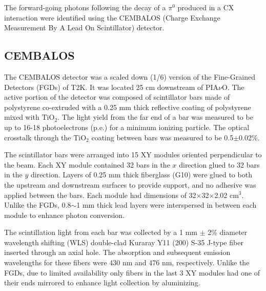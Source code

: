 The forward-going photons following the decay of a $\pi^0$ produced in a CX interaction were identified using the CEMBALOS (Charge Exchange Measurement By A Lead On Scintillator) detector.

\subsection{CEMBALOS}
The CEMBALOS detector was a scaled down (1/6) version of the Fine-Grained Detectors (FGDs) \cite{fgd} of T2K. It was located 25 cm downstream of PIA$\nu$O. The active portion of the detector was composed of scintillator bars made of polystyrene co-extruded with a 0.25 mm thick reflective coating of polystyrene mixed with TiO$_2$. The light yield from the far end of a bar was measured to be up to 16-18 photoelectrons (p.e.) for a minimum ionizing particle. The optical crosstalk through the TiO$_2$ coating between bars was measured to be 0.5$\pm$0.02\%. 

The scintillator bars were arranged into 15 XY modules oriented perpendicular to the beam. Each XY module contained 32 bars in the $x$ direction glued to 32 bars in the $y$ direction. Layers of 0.25 mm thick fiberglass (G10) were glued to both the upstream and downstream surfaces to provide support, and no adhesive was applied between the bars. Each module had dimensions of 32$\times$32$\times$2.02 cm$^3$. Unlike the FGDs, 0.8$\sim$1 mm thick lead layers were interspersed in between each module to enhance photon conversion. 


The scintillation light from each bar was collected by a 1 mm $\pm$ 2\% diameter wavelength shifting (WLS) double-clad Kuraray Y11 (200) S-35 J-type fiber inserted through an axial hole. The absorption and subsequent emission wavelengths for these fibers were 430 nm and 476 nm, respectively. Unlike the FGDs, due to limited availability only fibers in the last 3 XY modules had one of their ends mirrored to enhance light collection by aluminizing.


